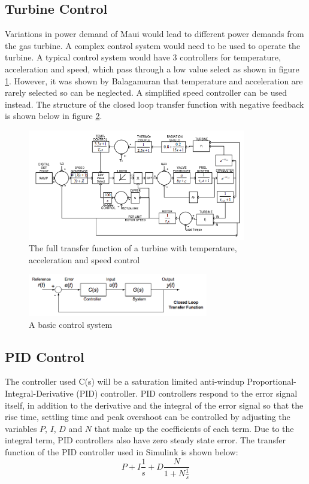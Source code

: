 \documentclass[11pt, oneside]{article}
\begin{document}
\subsection{Turbine Control}
Variations in power demand of Maui would lead to different power demands from the gas turbine. A complex control system would need to be used to operate the turbine. A typical control system would have 3 controllers for temperature, acceleration and speed, which pass through a low value select as shown in figure \ref{fig:turbinecont}. However, it was shown by Balagamuran \cite{balagamuran} that temperature and acceleration are rarely selected so can be neglected. A simplified speed controller can be used instead. The structure of the closed loop transfer function with negative feedback is shown below in figure \ref{fig:control}.

\begin{figure} [h]
\centering
\includegraphics[width=0.85\textwidth]{./pictures/turbinecont.png}
  \caption{The full transfer function of a turbine with temperature, acceleration and speed control \cite{balagamuran}} \label{fig:turbinecont}
  \end{figure}
  
\begin{figure} [h]
\centering
\includegraphics[width=0.7\textwidth]{./pictures/controlsystem.png}
  \caption{A basic control system \cite{A2notes}} \label{fig:control}
  \end{figure}
\subsection{PID Control}

The controller used C(s) will be a saturation limited anti-windup Proportional-Integral-Derivative (PID) controller. PID controllers respond to the error signal itself, in addition to the derivative and the integral of the error signal so that the rise time, settling time and peak overshoot can be controlled by adjusting the variables $P$, $I$, $D$ and $N$ that make up the coefficients of each term. Due to the integral term, PID controllers also have zero steady state error. The transfer function of the PID controller used in Simulink is shown below:
\begin{equation}
P + I\frac{1}{s} + D\frac{N}{1+N\frac{1}{s}}
\end{equation}
\end{document}
